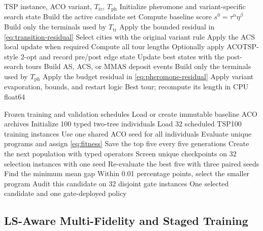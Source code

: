\documentclass[letterpaper,journal]{IEEEtran}
\begin{document}
\begin{algorithm}[t]
\caption{One RMTGP-ACO simulation}
\label{alg:rmtgp-aco}
\begin{algorithmic}[1]
\REQUIRE TSP instance, ACO variant, \(T_{\mathrm{tr}}\), \(T_{\mathrm{ph}}\)
\STATE Initialize pheromone and variant-specific search state
        \STATE Build the active candidate set
        \STATE Compute baseline score \(s^0=\tau^\alpha\eta^\beta\)
        \STATE Build only the terminals used by \(T_{\mathrm{tr}}\)
        \STATE Apply the bounded residual in \eqref{eq:transition-residual}
        \STATE Select cities with the original variant rule
        \STATE Apply the ACS local update when required
    \ENDFOR
    \STATE Compute all tour lengths
    \STATE Optionally apply ACOTSP-style 2-opt and record pre/post edge state
    \STATE Update best states with the post-search tours
    \STATE Build AS, ACS, or MMAS deposit events
    \STATE Build only the terminals used by \(T_{\mathrm{ph}}\)
    \STATE Apply the budget residual in \eqref{eq:pheromone-residual}
    \STATE Apply variant evaporation, bounds, and restart logic
\ENDFOR
\RETURN Best tour; recompute its length in CPU float64
\end{algorithmic}
\end{algorithm}

\begin{algorithm}[t]
\caption{GP training and champion selection}
\label{alg:gp-training}
\begin{algorithmic}[1]
\REQUIRE Frozen training and validation schedules
\STATE Load or create immutable baseline ACO archives
\STATE Initialize 100 typed two-tree individuals
    \STATE Load 32 scheduled TSP100 training instances
    \STATE Use one shared ACO seed for all individuals
    \STATE Evaluate unique programs and assign \eqref{eq:fitness}
    \STATE Save the top five every five generations
    \STATE Create the next population with typed operators
\ENDFOR
\STATE Screen unique checkpoints on 32 selection instances with one seed
\STATE Re-evaluate the best five with three paired seeds
\STATE Find the minimum mean gap
\STATE Within 0.01 percentage points, select the smaller program
\STATE Audit this candidate on 32 disjoint gate instances
\RETURN One selected candidate and one gate-deployed policy
\end{algorithmic}
\end{algorithm}

\subsection{LS-Aware Multi-Fidelity and Staged Training}
\end{document}
